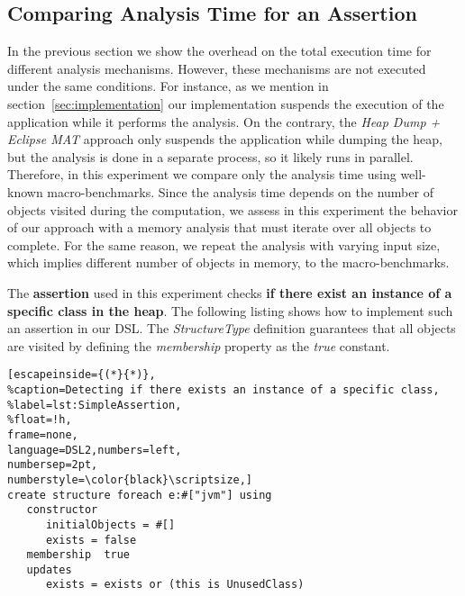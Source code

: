 \subsection{Comparing Analysis Time for an Assertion}

In the previous section we show the overhead on the total execution time for different analysis mechanisms.
However, these mechanisms are not executed under the same conditions.
For instance, as we mention in section~\ref{sec:implementation} our implementation suspends the execution of the application while it performs the analysis.
On the contrary, the \textit{Heap Dump + Eclipse MAT} approach only suspends the application while dumping the heap, but the analysis is done in a separate process, so it likely runs in parallel.
Therefore, in this experiment we compare only the analysis time using well-known macro-benchmarks.
Since the analysis time depends on the number of objects visited during the computation, we assess in this experiment the behavior of our approach with a memory analysis that must iterate over all objects to complete.
For the same reason, we repeat the analysis with varying input size, which implies different number of objects in memory, to the macro-benchmarks.

The \textbf{assertion} used in this experiment checks \textbf{if there exist an instance of a specific class in the heap}.
The following listing shows how to implement such an assertion in our DSL.
The \textit{StructureType} definition guarantees that all objects are visited by defining the \textit{membership} property as the \textit{true} constant.
\begin{lstlisting}[escapeinside={(*}{*)},
%caption=Detecting if there exists an instance of a specific class, 
%label=lst:SimpleAssertion,
%float=!h,
frame=none, 
language=DSL2,numbers=left,
numbersep=2pt,
numberstyle=\color{black}\scriptsize,]
create structure foreach e:#["jvm"] using
   constructor
      initialObjects = #[]
      exists = false
   membership  true
   updates
      exists = exists or (this is UnusedClass)
\end{lstlisting}

